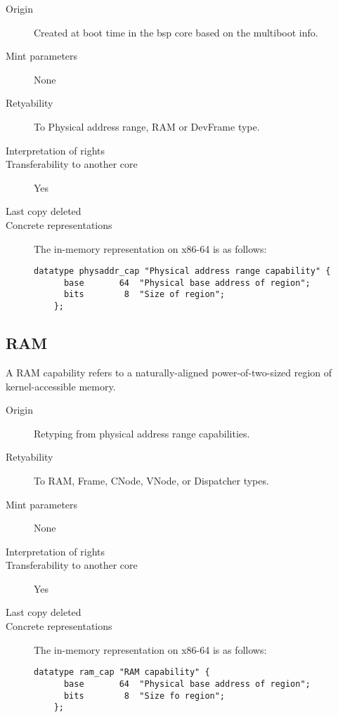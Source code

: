 \begin{description}
\item[Origin] Created at boot time in the bsp core based on the
  multiboot info.

\item[Mint parameters] None
  
\item[Retyability] To Physical address range, RAM or DevFrame type.
  
\item[Interpretation of rights] 
  
\item[Transferability to another core] Yes

\item[Last copy deleted] 
  
\item[Concrete representations] The in-memory representation on x86-64 is as follows:
  
  \begin{lstlisting}[language=Mackerel]
    datatype physaddr_cap "Physical address range capability" {
      base       64  "Physical base address of region";
      bits        8  "Size of region";
    };
  \end{lstlisting}
\end{description}

\subsection{RAM}

A RAM capability refers to a naturally-aligned power-of-two-sized
region of kernel-accessible memory.

\begin{description}
\item[Origin] Retyping from physical address range capabilities.
  
\item[Retyability] To RAM, Frame, CNode, VNode, or Dispatcher types.
  
\item[Mint parameters] None
  
\item[Interpretation of rights] 
  
\item[Transferability to another core] Yes

\item[Last copy deleted] 
  
\item[Concrete representations] The in-memory representation on x86-64 is as follows:
  
  \begin{lstlisting}[language=Mackerel]
    datatype ram_cap "RAM capability" {
      base       64  "Physical base address of region";
      bits        8  "Size fo region";
    };
  \end{lstlisting}
\end{description}

